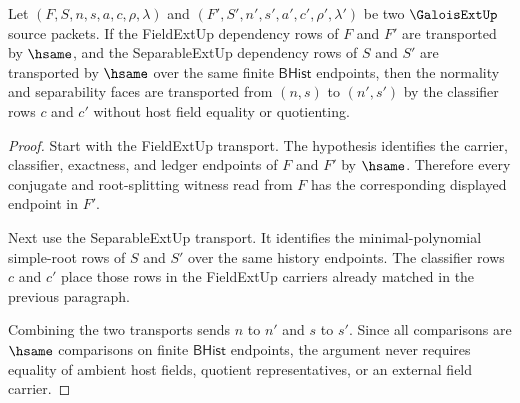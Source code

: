 \begin{theorem}
\label{thm:galoisext-classifier-transport-row}
Let $(F,S,n,s,a,c,\rho,\lambda)$ and
$(F',S',n',s',a',c',\rho',\lambda')$ be two $\GaloisExtUp$ source packets. If the
FieldExtUp dependency rows of $F$ and $F'$ are transported by $\hsame$, and the
SeparableExtUp dependency rows of $S$ and $S'$ are transported by $\hsame$ over
the same finite $\mathsf{BHist}$ endpoints, then the normality and separability
faces are transported from $(n,s)$ to $(n',s')$ by the classifier rows $c$ and
$c'$ without host field equality or quotienting.
\end{theorem}
\begin{proof}
Start with the FieldExtUp transport. The hypothesis identifies the carrier,
classifier, exactness, and ledger endpoints of $F$ and $F'$ by $\hsame$.
Therefore every conjugate and root-splitting witness read from $F$ has the
corresponding displayed endpoint in $F'$.

Next use the SeparableExtUp transport. It identifies the minimal-polynomial
simple-root rows of $S$ and $S'$ over the same history endpoints. The
classifier rows $c$ and $c'$ place those rows in the FieldExtUp carriers
already matched in the previous paragraph.

Combining the two transports sends $n$ to $n'$ and $s$ to $s'$. Since all
comparisons are $\hsame$ comparisons on finite $\mathsf{BHist}$ endpoints, the
argument never requires equality of ambient host fields, quotient
representatives, or an external field carrier.
\end{proof}


